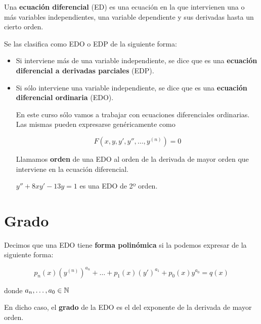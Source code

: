 \begin{definition}[ED]
Una \textbf{ecuación diferencial} (ED)  es una ecuación en la que intervienen una o más variables independientes, una variable dependiente y sus derivadas hasta un cierto orden.

Se las clasifica como EDO o EDP de la siguiente forma:

\begin{itemize}
\item Si interviene más de una variable independiente, se dice que es una \textbf{ecuación diferencial a derivadas parciales} (EDP). 

\item Si sólo interviene una variable independiente, se dice que es una \textbf{ecuación diferencial ordinaria} (EDO). 

En este curso sólo vamos a trabajar con ecuaciones diferenciales ordinarias.  Las mismas pueden expresarse genéricamente como

$$ F(x,y,y',y'', \ldots, y^{(n)}) = 0 $$

Llamamos \textbf{orden}  de una EDO al orden de la derivada de mayor orden que interviene en la ecuación diferencial.

\begin{example}
$ y'' + 8xy' - 13y = 1$ es una EDO de 2º orden.
\end{example}

\end{itemize}

\end{definition}


\section{Grado}

\begin{definition}[Polinómica]
Decimos que una EDO tiene \textbf{forma polinómica}  si la podemos expresar de la siguiente forma:

$$ p_n(x) (y^{(n)})^{a_n} + \ldots + p_1(x) (y')^{a_1} + p_0(x) y^{a_0} = q(x)$$

donde $a_n, \ldots, a_0 \in \mathbb{N}$

En dicho caso, el \textbf{grado}  de la EDO es el del exponente de la derivada de mayor orden.
\end{definition}


